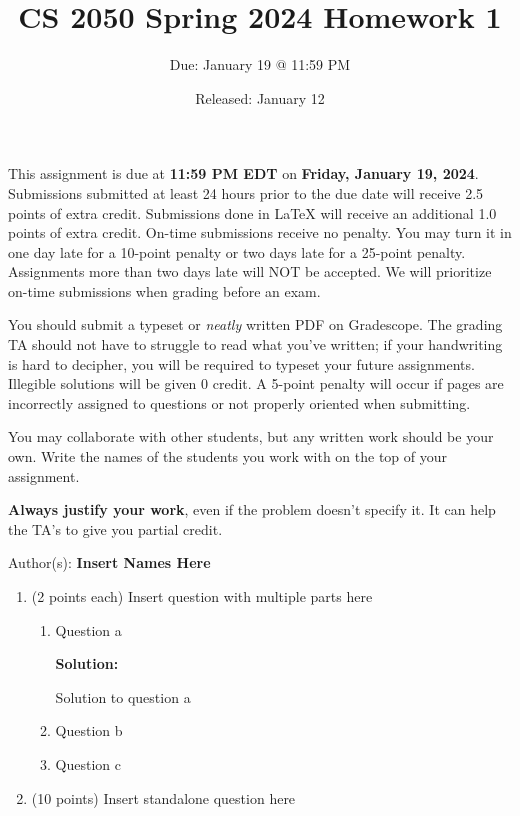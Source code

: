 \documentclass[11pt]{article}
\title{CS 2050 Spring 2024 Homework 1}
\author{Due: January 19 @ 11:59 PM}
\date{Released: January 12}
\newenvironment{solution}
{
\vspace{0.5mm}
\begin{mdframed}[linewidth=3pt,leftline=true,rightline=false,bottomline=false,topline=false,linecolor=maincolor,backgroundcolor=maincolor!10]\color{maincolor}\textbf{\textsf{Solution: }}\color{black}

}
{\color{black}\end{mdframed}\vspace{0.5mm}}
\newcommand{\pt}[1]{\textcolor{maincolor}{(#1 points)}}
\newcommand{\pte}[1]{\textcolor{maincolor}{(#1 points each)}}
\begin{document}
\maketitle

\begin{justify}
    This assignment is due at \textbf{11:59 PM EDT} on \textbf{Friday, January 19, 2024}. Submissions submitted at least 24 hours prior to the due date will receive 2.5 points of extra credit. Submissions done in LaTeX will receive an additional 1.0 points of extra credit. On-time submissions receive no penalty. You may turn it in one day late for a 10-point penalty or two days late for a 25-point penalty. Assignments more than two days late will NOT be accepted.  We will prioritize on-time submissions when grading before an exam.

    \bigskip

    You should submit a typeset or \emph{neatly} written PDF on Gradescope.  The grading TA should not have to struggle to read what you've written; if your handwriting is hard to decipher, you will be required to typeset your future assignments. Illegible solutions will be given 0 credit. A 5-point penalty will occur if pages are incorrectly assigned to questions or not properly oriented when submitting.

    \bigskip

    You may collaborate with other students, but any written work should be your own. Write the names of the students you work with on the top of your assignment.

    \bigskip

    \textbf{Always justify your work}, even if the problem doesn't specify it. It can help the TA's to give you partial credit.

    \bigskip

    Author(s): \textbf{Insert Names Here}

\clearpage





\begin{enumerate}

    \item \pte{2} Insert question with multiple parts here
    
    \begin{enumerate}
        \item Question a
            \begin{solution}
                Solution to question a
            \end{solution}

        \item Question b
        \item Question c
    \end{enumerate}

    \item \pt{10} Insert standalone question here
    
\end{enumerate}
\end{justify}
\end{document}
